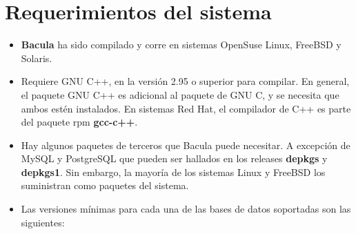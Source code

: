 

\chapter{Requerimientos del sistema} \label{SysReqs} 
\begin{itemize}
\item \textbf{Bacula} ha sido compilado y corre en sistemas OpenSuse Linux, FreeBSD
y Solaris. 
\item Requiere GNU C++, en la versión 2.95 o superior para compilar. En general, el
paquete GNU C++ es adicional al paquete de GNU C, y se necesita que ambos estén
instalados. En sistemas Red Hat, el compilador de C++ es parte del paquete rpm
\textbf{gcc-c++}. 
\item Hay algunos paquetes de terceros que Bacula puede necesitar. A excepción de
MySQL y PostgreSQL que pueden ser hallados en los releases \textbf{depkgs} y
\textbf{depkgs1}. Sin embargo, la mayoría de los sistemas Linux y FreeBSD los
suministran como paquetes del sistema. 
\item Las versiones mínimas para cada una de las bases de datos soportadas son las
siguientes:


\end{itemize}
